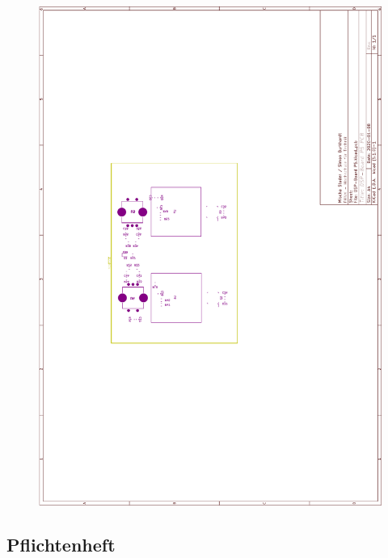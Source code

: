 \begin{appendix}
\begin{figure}[h]
	\centering
	\includegraphics[width=0.95\linewidth]{appendix/DSP-Board-PCB-V1-1(4).pdf}
\end{figure}
\clearpage

\subsection{Pflichtenheft}
\label{app:Pflichtenheft}


\end{appendix}
